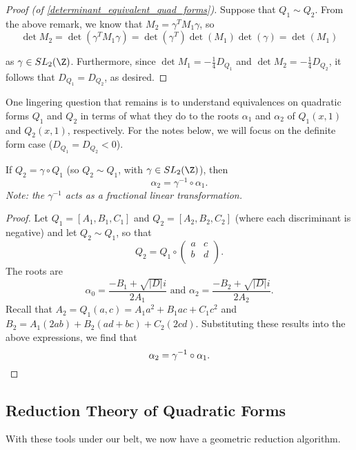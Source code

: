 \documentclass[11pt]{article}
\begin{document}
\begin{proof}[Proof (of \cref{determinant_equivalent_quad_forms})]
Suppose that $Q_1 \sim Q_2$. From the above remark, we know that $M_2 = \gamma^T M_1 \gamma$, so
\[
    \det M_2 = \det(\gamma^T M_1 \gamma) = \det(\gamma^T) \det(M_1) \det(\gamma) = \det(M_1)
\]

as $\gamma \in SL_2(\Z)$. Furthermore, since $\det M_1 = -\frac{1}{4}D_{Q_1}$ and $\det M_2 = -\frac{1}{4}D_{Q_2}$,
it follows that $D_{Q_1} = D_{Q_2}$, as desired.
\end{proof}

One lingering question that remains is to understand equivalences on quadratic forms $Q_1$ and $Q_2$ in terms of 
what they do to the roots $\alpha_{1}$ and $\alpha_2$ of $Q_1(x, 1)$ and $Q_2(x, 1)$, respectively. For the notes below, we will
focus on the definite form case ($D_{Q_1} = D_{Q_2} < 0$). \\
\newpage

\begin{theorem}
If $Q_2 = \gamma \circ Q_1$ (so $Q_2 \sim Q_1$, with $\gamma \in SL_2(\Z)$), then 
\[
    \alpha_2 = \gamma^{-1} \circ \alpha_1.
\]
\textit{Note: the $\gamma^{-1}$ acts as a fractional linear transformation.}
\end{theorem}

\begin{proof}
Let $Q_1 = [A_1, B_1, C_1]$ and $Q_2 = [A_2, B_2, C_2]$ (where each discriminant is negative) and let $Q_2 \sim Q_1$, so that
\[
    Q_2 = Q_1 \circ \begin{pmatrix}
        a & c \\
        b & d \\
    \end{pmatrix}.
\]
The roots are 
\[
\alpha_0 = \frac{-B_1 + \sqrt{|D|}i}{2A_1} \text{ and } \alpha_2 = \frac{-B_2 + \sqrt{|D|}i}{2A_{2}}.
\]
Recall that $A_2 = Q_1(a, c) = A_1a^2 + B_1ac + C_1c^2$ and $B_2 = A_1(2ab) + B_2(ad + bc) + C_2(2cd)$. 
Substituting these results into the above expressions, we find that
\[
\alpha_2 = \gamma^{-1} \circ \alpha_1. \qedhere
\]
\end{proof}

\subsection{Reduction Theory of Quadratic Forms}
With these tools under our belt, we now have a geometric reduction algorithm. \\
\end{document}

